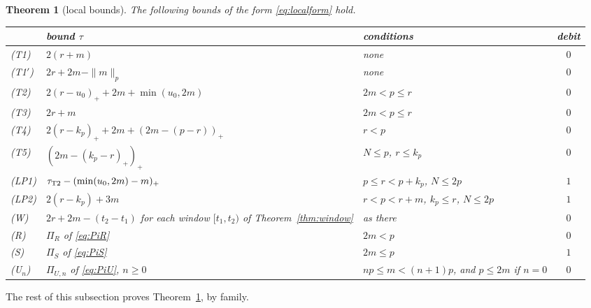 \documentclass[11pt]{amsart}
\newtheorem{theorem}{Theorem}[section]
\theoremstyle{definition}
\theoremstyle{remark}
\numberwithin{equation}{section}
\begin{document}
\begin{theorem}[local bounds]\label{thm:local}
The following bounds of the form \eqref{eq:localform} hold.
\begin{center}
{\renewcommand{\arraystretch}{1.2}
\begin{tabular}{@{}lp{}p{}c@{}}
\toprule
 & bound $\tau$ & conditions & debit\\
\midrule
(T1) & $2(r+m)$ & none & $0$\\
(T1$'$) & $2r+2m-\|m\|_p$ & none & $0$\\
(T2) & $2(r-u_0)_++2m+\min(u_0,2m)$ & $2m<p\le r$ & $0$\\
(T3) & $2r+m$ & $2m<p\le r$ & $0$\\
(T4) & $2(r-k_p)_++2m+(2m-(p-r))_+$ & $r<p$ & $0$\\
(T5) & $(2m-(k_p-r)_+)_+$ & $N\le p$, $r\le k_p$ & $0$\\
(LP1) & $\tau_{\rm T2}-(\min(u_0,2m)-m)_+$ & $p\le r<p+k_p$, $N\le2p$ & $1$\\
(LP2) & $2(r-k_p)+3m$ & $r<p<r+m$, $k_p\le r$, $N\le2p$ & $1$\\
(W) & $2r+2m-(t_2-t_1)$ for each window $[t_1,t_2)$ of Theorem~\ref{thm:window} & as there & $0$\\
(R) & $\Pi_R$ of \eqref{eq:PiR} & $2m<p$ & $0$\\
(S) & $\Pi_S$ of \eqref{eq:PiS} & $2m\le p$ & $1$\\
(U$_n$) & $\Pi_{U,n}$ of \eqref{eq:PiU}, $n\ge0$ & $np\le m<(n+1)p$, and $p\le2m$ if $n=0$ & $0$\\
\bottomrule
\end{tabular}}
\end{center}
\end{theorem}

The rest of this subsection proves Theorem~\ref{thm:local}, by family.
\end{document}
